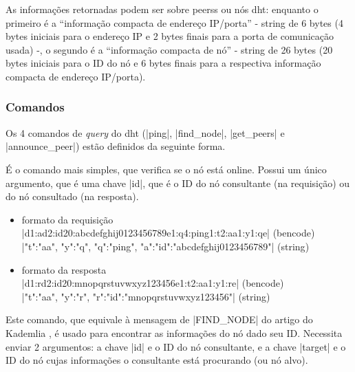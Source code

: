 As informações retornadas podem ser sobre \glspl*{peers} ou nós \gls*{dht}: enquanto o
primeiro é a \enquote{informação compacta de endereço IP/porta} - string de 6 bytes (4
bytes iniciais para o endereço IP e 2 bytes finais para a porta de comunicação usada)
-, o segundo é a \enquote{informação compacta de nó} - string de 26 bytes (20 bytes
iniciais para o ID do nó e 6 bytes finais para a respectiva informação compacta de
endereço IP/porta).

\subsubsection*{Comandos}

Os 4 comandos de \emph{query} do \gls*{dht} (\bverb|ping|, \bverb|find_node|,
\bverb|get_peers| e \bverb|announce_peer|) estão definidos da seguinte forma.

{}

É o comando mais simples, que verifica se o nó está online. Possui um único argumento,
que é uma chave \bverb|id|, que é o ID do nó consultante (na requisição) ou do nó
consultado (na resposta).

\begin{itemize}
    \item formato da requisição \\
        \bverb|d1:ad2:id20:abcdefghij0123456789e1:q4:ping1:t2:aa1:y1:qe|
        (\gls*{bencode}) \\
        \sverb|{"t":"aa", "y":"q", "q":"ping", "a":{"id":"abcdefghij0123456789"}}|
        (\gls*{string})

    \item formato da resposta \\
        \bverb|d1:rd2:id20:mnopqrstuvwxyz123456e1:t2:aa1:y1:re|
        (\gls*{bencode}) \\
        \sverb|{"t":"aa", "y":"r", "r":{"id":"mnopqrstuvwxyz123456"}}|
        (\gls*{string})
\end{itemize}


\newpage
{}

Este comando, que equivale à mensagem de \bverb|FIND\_NODE| do artigo do Kademlia
\cite{artigo:kademlia}, é usado para encontrar as informações do nó dado seu ID.
Necessita enviar 2 argumentos: a chave \bverb|id| e o ID do nó consultante, e a chave
\bverb|target| e o ID do nó cujas informações o consultante está procurando (ou nó
alvo).


